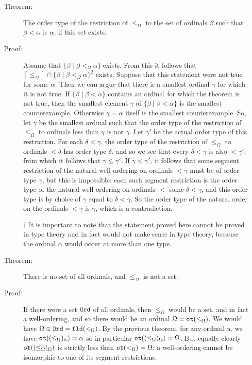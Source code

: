 \documentclass[12pt]{book}
\begin{document}
\begin{description}
\item[Theorem:]  The order type of the restriction of $\leq_{\Omega}$ to the set of ordinals $\beta$ such that $\beta<\alpha$ is $\alpha$, if this set exists.

\item[Proof:]  Assume that $\{\beta \mid \beta <_{\Omega} \alpha\}$ exists.  From this it follows that \newline $[\leq_{\Omega}] \cap \{\beta \mid \beta <_{\Omega} \alpha\}^2$ exists.
Suppose that this statement were  not true for some $\alpha$.   Then we can argue that there is a smallest ordinal $\gamma$ for which it is not true.  If $\{\beta \mid \beta<\alpha\}$
contains an ordinal for which the theorem is not true, then the smallest element $\gamma$ of $\{\beta \mid \beta<\alpha\}$ is the smallest counterexample.  Otherwise $\gamma=\alpha$ itself is the smallest counterexample.  So, let $\gamma$ be the smallest ordinal such that the order type of the restriction of $\leq_{\Omega}$ to
ordinals less than $\gamma$ is not $\gamma$.  Let $\gamma'$ be the actual order type of this restriction.  For each $\delta<\gamma$, the order type of the restriction of $\leq_{\Omega}$ to ordinals $<\delta$ has order type $\delta$, and so we see that every $\delta<\gamma$ is also $<\gamma'$, from which it follows that $\gamma \leq \gamma'$.
If $\gamma<\gamma'$, it follows that some segment restriction of the natural well ordering on ordinals $<\gamma$ must be of order type $\gamma$, but this is impossible:
each such segment restriction is the order type of the natural well-ordering on ordinals $<$ some $\delta<\gamma$, and this order type is by choice of $\gamma$ equal to $\delta<\gamma$.  So the order type of the natural order on the ordinals $<\gamma$ is $\gamma$, which is a contradiction.

$\dagger$ It is important to note that the statement proved here cannot be proved in type theory and in fact would not make sense in type theory, because the ordinal $\alpha$ would occur at more than one type.

\item[Theorem:]  There is no set of all ordinals, and $\leq_{\Omega}$ is not a set.

\item[Proof:]  If there were a set ${\tt Ord}$ of all ordinals, then $\leq_{\Omega}$ would be a set, and in fact a well-ordering, and so there would be an ordinal $\Omega = {\tt ot}(\leq_{\Omega})$.  We would have $\Omega \in {\tt Ord} = {\tt fld}(<_{\Omega})$.  By the previous theorem, for any ordinal $\alpha$, we have ${\tt ot}((\leq_{\Omega})_{\alpha}) = \alpha$ so in particular ${\tt ot}((\leq_{\Omega})_{\Omega}) = \Omega$.  But equally clearly ${\tt ot}((\leq_{\Omega})_{\Omega})$ is strictly less than ${\tt ot}(<_{\Omega})= \Omega$;  a well-ordering cannot be isomorphic to one of its segment restrictions.

\end{description}
\end{document}
